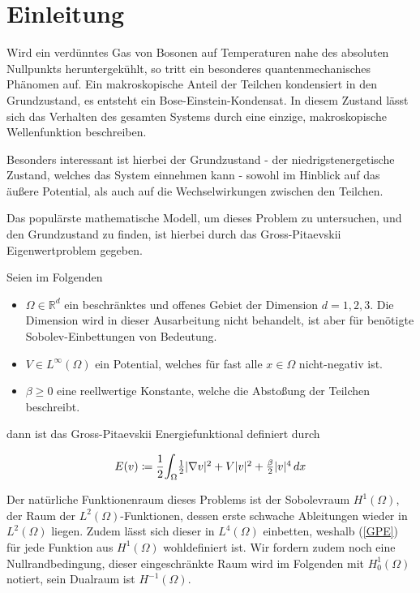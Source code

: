 \documentclass[final,bibliography=totocnumbered]{include/seminar}
\newcommand{\mRd}{\ensuremath{\mathbb{R}^d}}
\newcommand{\Ltwo}{\ensuremath{{L^2(\Omega)}}}
\newcommand{\Hone}{\ensuremath{{H^1(\Omega)}}}
\newcommand{\Honez}{\ensuremath{{H^1_0(\Omega)}}}
\newcommand{\Hdual}{\ensuremath{{H^{-1}(\Omega)}}}
\newcommand{\GP}{Gross-\allowbreak Pi\-taev\-skii}
\newcommand{\GPEnergy}{Gross-Pitaevskii Energiefunktional}
\theoremstyle{break}
\begin{document}
\newpage

\section{Einleitung}

Wird ein verdünntes Gas von Bosonen auf Temperaturen nahe des absoluten Nullpunkts
heruntergekühlt, so tritt ein besonderes quantenmechanisches Phänomen auf.
Ein makroskopische Anteil der Teilchen kondensiert in den Grundzustand, es
entsteht ein Bose-Einstein-Kondensat. In diesem Zustand lässt sich das Verhalten
des gesamten Systems durch eine einzige, makroskopische Wellenfunktion beschreiben.

Besonders interessant ist hierbei der Grundzustand - der niedrigstenergetische
Zustand, welches das System einnehmen kann - sowohl im Hinblick auf das äußere
Potential, als auch auf die Wechselwirkungen zwischen den Teilchen.

Das populärste mathematische Modell, um dieses Problem zu untersuchen, und
den Grundzustand zu finden, ist hierbei durch das \GP{} Eigenwertproblem gegeben.

\medskip

Seien im Folgenden

\begin{itemize}
    \item $\Omega \in \mRd$ ein beschränktes und offenes Gebiet der Dimension $d = 1,2,3$.
		Die Dimension wird in dieser Ausarbeitung nicht behandelt, ist aber für
		benötigte Sobolev-Einbettungen von Bedeutung.
    \item $V \in L^\infty(\Omega)$ ein Potential, welches für fast alle $x \in
		\Omega$ nicht-negativ ist.
    \item $\beta \geq 0$ eine reellwertige Konstante, welche die Abstoßung der
		Teilchen beschreibt.
\end{itemize}

dann ist das {\GPEnergy} definiert durch

\begin{align}\label{GPE}
    E(v) \coloneq \frac{1}{2} \mathlarger{\int}_{\Omega} \mathsmaller{\frac{1}{2}\vert \nabla v \vert ^2 + V \vert v \vert ^2 + \frac{\beta}{2}\vert v \vert ^4} \,dx
\end{align}

Der natürliche Funktionenraum dieses Problems ist der Sobolevraum $\Hone$, der Raum der $\Ltwo$-Funktionen,
dessen erste schwache Ableitungen wieder in $\Ltwo$ liegen.
Zudem lässt sich dieser in $L^4(\Omega)$ einbetten, weshalb (\ref{GPE}) für
jede Funktion aus $\Hone$ wohldefiniert ist.
Wir fordern zudem noch eine Nullrandbedingung, dieser eingeschränkte Raum
wird im Folgenden mit $\Honez$ notiert, sein Dualraum ist $\Hdual$.
\end{document}

